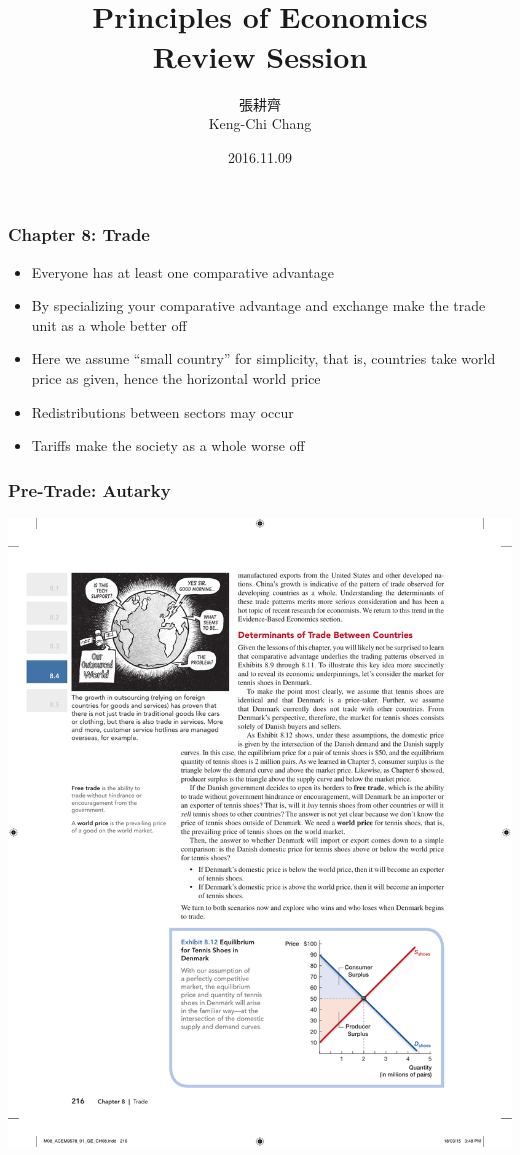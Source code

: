 \documentclass[12pt, xcolor=dvipsnames]{beamer}
\title{\bf{\Huge {}\\[-2mm] Principles of Economics \\[2mm] Review Session}}
\author{{\Large 張耕齊\\[2mm] Keng-Chi Chang}}
\institute{{}\\[-7mm]\footnotesize\tt{<r03323070@ntu.edu.tw>}\\[2mm]}
\date{\large 2016.11.09}
\begin{document}
\fontsize{12}{14pt}\selectfont

\begin{frame}
\titlepage
\end{frame}

\begin{frame}
\frametitle{\bf Chapter 8: Trade}
\begin{itemize}
\item Everyone has at least one comparative advantage
\item By specializing your comparative advantage and exchange make the trade unit as a whole better off
\item Here we assume ``small country'' for simplicity, that is, countries take world price as given, hence the horizontal world price
\item Redistributions between sectors may occur
\item Tariffs make the society as a whole worse off
\end{itemize}
\end{frame}


\begin{frame}
\frametitle{\bf Pre-Trade: Autarky}
\begin{center}
\includegraphics[height=.85\textheight]{figures/1.pdf}
\end{center}
\end{frame}
\end{document}
